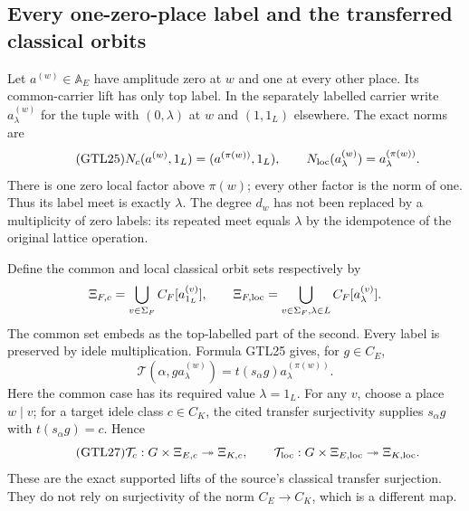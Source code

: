 \subsection{Every one-zero-place label and the transferred classical orbits}

Let $a^{(w)}\in\mathbb A_E$ have amplitude zero at $w$ and one
at every other place. Its common-carrier lift has only top label.
In the separately labelled carrier write $a^{(w)}_\lambda$ for
the tuple with $(0,\lambda)$ at $w$ and $(1,1_L)$ elsewhere.
The exact norms are
\begin{equation}\tag{GTL25}
 N_c(a^{(w)},1_L)=(a^{(\pi(w))},1_L),\qquad
 N_{\rm loc}(a^{(w)}_\lambda)=a^{(\pi(w))}_\lambda.
\end{equation}
There is one zero local factor above $\pi(w)$; every other
factor is the norm of one. Thus its label meet is exactly
$\lambda$. The degree $d_w$ has not been replaced by a
multiplicity of zero labels: its repeated meet equals $\lambda$
by the idempotence of the original lattice operation.

Define the common and local classical orbit sets respectively by
\[
 \Xi_{F,c}=\bigcup_{v\in\Sigma_F}C_F[a^{(v)}_{1_L}],
 \qquad
 \Xi_{F,\rm loc}=\bigcup_{v\in\Sigma_F,\lambda\in L}
                                      C_F[a^{(v)}_\lambda].
\]
The common set embeds as the top-labelled part of the second.
Every label is preserved by idele multiplication. Formula GTL25
gives, for $g\in C_E$,
\begin{equation}\tag{GTL26}
 \mathcal T(\alpha,g a^{(w)}_\lambda)
       =t(s_\alpha g)a^{(\pi(w))}_\lambda.
\end{equation}
Here the common case has its required value $\lambda=1_L$.
For any $v$, choose a place $w\mid v$; for a target idele class
$c\in C_K$, the cited transfer surjectivity supplies
$s_\alpha g$ with $t(s_\alpha g)=c$. Hence
\begin{equation}\tag{GTL27}
 \mathcal T_c:G\times\Xi_{E,c}\twoheadrightarrow\Xi_{K,c},
 \qquad
 \mathcal T_{\rm loc}:G\times\Xi_{E,\rm loc}
                                  \twoheadrightarrow\Xi_{K,\rm loc}.
\end{equation}
These are the exact supported lifts of the source's classical
transfer surjection. They do not rely on surjectivity of the
norm $C_E\to C_K$, which is a different map.


